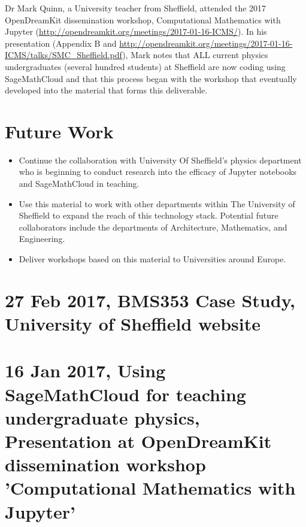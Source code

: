 \documentclass{deliverablereport}
\begin{document}
Dr Mark Quinn, a University teacher from Sheffield, attended the 2017 OpenDreamKit dissemination workshop, Computational Mathematics with Jupyter (\url{http://opendreamkit.org/meetings/2017-01-16-ICMS/}). In his presentation (Appendix B and \url{http://opendreamkit.org/meetings/2017-01-16-ICMS/talks/SMC_Sheffield.pdf}), Mark notes that ALL current physics undergraduates (several hundred students) at Sheffield are now coding using SageMathCloud and that this process began with the workshop that eventually developed into the material that forms this deliverable.
\section{Future Work}
\begin{itemize}
\item Continue the collaboration with University Of Sheffield's physics department who is beginning to conduct research into the efficacy of Jupyter notebooks and SageMathCloud in teaching.
\item Use this material to work with other departments within The University of Sheffield to expand the reach of this technology stack. Potential future collaborators include the departments of Architecture, Mathematics, and Engineering.
\item Deliver workshops based on this material to Universities around Europe.
\end{itemize}

\appendix
\section{27 Feb 2017, BMS353 Case Study, University of Sheffield website}

\section{16 Jan 2017, Using SageMathCloud for teaching undergraduate physics, Presentation at OpenDreamKit dissemination workshop 'Computational Mathematics with Jupyter'}

\end{document}
